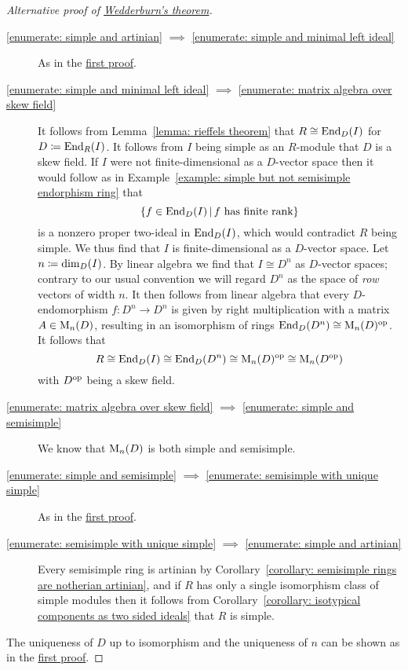 \begin{proof}[Alternative proof of {\hyperref[theorem: wedderburns theorem]{Wedderburn’s theorem}}]
  \leavevmode
  \begin{description}
    \item[\ref*{enumerate: simple and artinian} $\implies$ \ref*{enumerate: simple and minimal left ideal}]
      As in the \hyperref[proof: wedderburns theorem first proof]{first proof}.
    \item[\ref*{enumerate: simple and minimal left ideal} $\implies$ \ref*{enumerate: matrix algebra over skew field}]
      It follows from Lemma~\ref{lemma: rieffels theorem} that $R \cong \operatorname{End}_D(I)$ for $D \coloneqq \operatorname{End}_R(I)$.
      It follows from $I$ being simple as an $R$-module that $D$ is a skew field.
      If $I$ were not finite-dimensional as a $D$-vector space then it would follow as in Example~\ref{example: simple but not semisimple endorphism ring} that
      \[
        \{
          f \in \End_D(I)
        \suchthat
          \text{$f$ has finite rank}
        \}
      \]
      is a nonzero proper two-ideal in $\operatorname{End}_D(I)$, which would contradict $R$ being simple.
      We thus find that $I$ is finite-dimensional as a $D$-vector space.
      Let $n \coloneqq \dim_D(I)$.
      By linear algebra we find that $I \cong D^n$ as $D$-vector spaces;
      contrary to our usual convention we will regard $D^n$ as the space of \emph{row} vectors of width $n$.
      It then follows from linear algebra that every $D$-endomorphism $f \colon D^n \to D^n$ is given by right multiplication with a matrix $A \in \operatorname{M}_n(D)$, resulting in an isomorphism of rings $\operatorname{End}_D(D^n) \cong \operatorname{M}_n(D)^{\operatorname{op}}$.
      It follows that
      \[
              R
        \cong \operatorname{End}_D(I)
        \cong \operatorname{End}_D(D^n)
        \cong \operatorname{M}_n(D)^{\operatorname{op}}
        \cong \operatorname{M}_n(D^{\operatorname{op}})
      \]
      with $D^{\operatorname{op}}$ being a skew field.
    \item[\ref*{enumerate: matrix algebra over skew field} $\implies$ \ref*{enumerate: simple and semisimple}]
      We know that $\operatorname{M}_n(D)$ is both simple and semisimple.
    \item[\ref*{enumerate: simple and semisimple} $\implies$ \ref*{enumerate: semisimple with unique simple}]
      As in the \hyperref[proof: wedderburns theorem first proof]{first proof}.
    \item[\ref*{enumerate: semisimple with unique simple} $\implies$ \ref*{enumerate: simple and artinian}]
      Every semisimple ring is artinian by Corollary~\ref{corollary: semisimple rings are notherian artinian}, and if $R$ has only a single isomorphism class of simple modules then it follows from Corollary~\ref{corollary: isotypical components as two sided ideals} that $R$ is simple.
  \end{description}
  The uniqueness of $D$ up to isomorphism and the uniqueness of $n$ can be shown as in the \hyperref[proof: wedderburns theorem first proof]{first proof}.
\end{proof}


